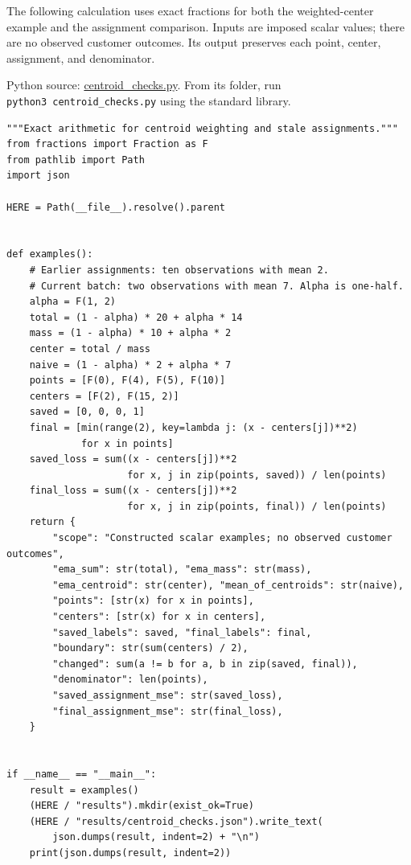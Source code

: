 The following calculation uses exact fractions for both the
weighted-center example and the assignment comparison. Inputs are
imposed scalar values; there are no observed customer outcomes. Its
output preserves each point, center, assignment, and denominator.

\FloatBarrier
{}
Python source:
\href{../03_Data_and_Code/Clustering_Optimization/centroid_checks.py}{centroid\_checks.py}.
From its folder, run \texttt{python3\ centroid\_checks.py} using the
standard library.

\begin{Verbatim}[breaklines,breakanywhere,fontsize=\small]
"""Exact arithmetic for centroid weighting and stale assignments."""
from fractions import Fraction as F
from pathlib import Path
import json

HERE = Path(__file__).resolve().parent


def examples():
    # Earlier assignments: ten observations with mean 2.
    # Current batch: two observations with mean 7. Alpha is one-half.
    alpha = F(1, 2)
    total = (1 - alpha) * 20 + alpha * 14
    mass = (1 - alpha) * 10 + alpha * 2
    center = total / mass
    naive = (1 - alpha) * 2 + alpha * 7
    points = [F(0), F(4), F(5), F(10)]
    centers = [F(2), F(15, 2)]
    saved = [0, 0, 0, 1]
    final = [min(range(2), key=lambda j: (x - centers[j])**2)
             for x in points]
    saved_loss = sum((x - centers[j])**2
                     for x, j in zip(points, saved)) / len(points)
    final_loss = sum((x - centers[j])**2
                     for x, j in zip(points, final)) / len(points)
    return {
        "scope": "Constructed scalar examples; no observed customer outcomes",
        "ema_sum": str(total), "ema_mass": str(mass),
        "ema_centroid": str(center), "mean_of_centroids": str(naive),
        "points": [str(x) for x in points],
        "centers": [str(x) for x in centers],
        "saved_labels": saved, "final_labels": final,
        "boundary": str(sum(centers) / 2),
        "changed": sum(a != b for a, b in zip(saved, final)),
        "denominator": len(points),
        "saved_assignment_mse": str(saved_loss),
        "final_assignment_mse": str(final_loss),
    }


if __name__ == "__main__":
    result = examples()
    (HERE / "results").mkdir(exist_ok=True)
    (HERE / "results/centroid_checks.json").write_text(
        json.dumps(result, indent=2) + "\n")
    print(json.dumps(result, indent=2))
\end{Verbatim}

